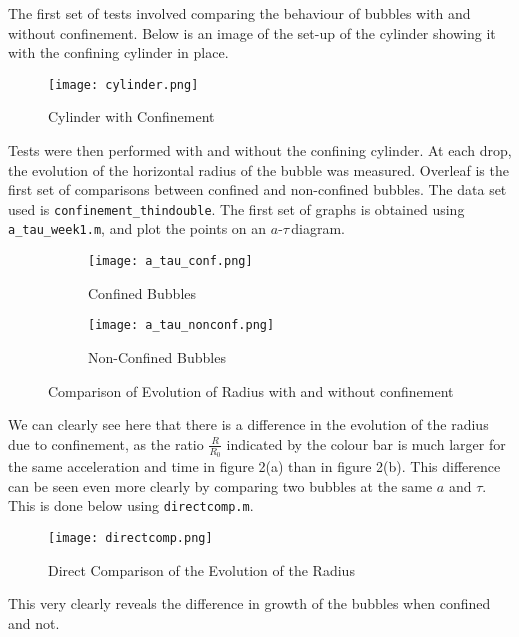 \documentclass{article}
\newcommand{\at}{$a$-$\tau$\,}
\begin{document}
The first set of tests involved comparing the behaviour of bubbles with and without confinement. Below is an image of the set-up of the cylinder showing it with the confining cylinder in place.\\
\begin{figure}[H]
    \centering
    \texttt{[image: cylinder.png]}
    \caption{Cylinder with Confinement}
\end{figure}
Tests were then performed with and without the confining cylinder. At each drop, the evolution of the horizontal radius of the bubble was measured. Overleaf is the first set of comparisons between confined and non-confined bubbles. The data set used is \texttt{confinement\_thindouble}. The first set of graphs is obtained using \texttt{a\_tau\_week1.m}, and plot the points on an \at diagram.
\begin{figure}[H]
  \centering
  \begin{subfigure}[b]{0.49\linewidth}
    \texttt{[image: a\_tau\_conf.png]}
    \caption{Confined Bubbles}
  \end{subfigure}
  \begin{subfigure}[b]{0.49\linewidth}
    \texttt{[image: a\_tau\_nonconf.png]}
    \caption{Non-Confined Bubbles}
  \end{subfigure}
  \caption{Comparison of Evolution of Radius with and without confinement}
\end{figure}
We can clearly see here that there is a difference in the evolution of the radius due to confinement, as the ratio $\frac{R}{R_0}$ indicated by the colour bar is much larger for the same acceleration and time in figure 2(a) than in figure 2(b). This difference can be seen even more clearly by comparing two bubbles at the same $a$ and $\tau$. This is done below using \texttt{directcomp.m}.
\begin{figure}[H]
    \centering
    \texttt{[image: directcomp.png]}
    \caption{Direct Comparison of the Evolution of the Radius}
\end{figure}
This very clearly reveals the difference in growth of the bubbles when confined and not.
\end{document}

